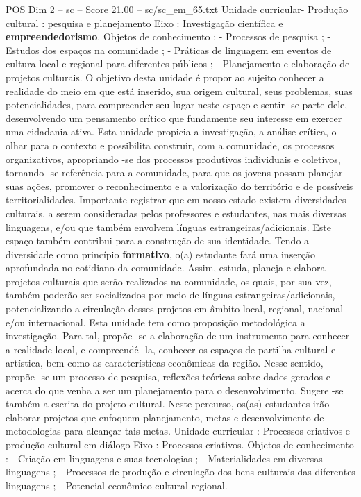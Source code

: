 \begin{textsample}{POS Dim 2 – sc – Score 21.00 – sc/sc\_em\_65.txt}
Unidade curricular- Produção cultural : pesquisa e planejamento Eixo : Investigação científica e \textbf{empreendedorismo}.
Objetos de conhecimento : - Processos de pesquisa ; - Estudos dos espaços na comunidade ; - Práticas de linguagem em eventos de cultura local e regional para diferentes públicos ; - Planejamento e elaboração de projetos culturais.
O objetivo desta unidade é propor ao sujeito conhecer a realidade do meio em que está inserido, sua origem cultural, seus problemas, suas potencialidades, para compreender seu lugar neste espaço e sentir -se parte dele, desenvolvendo um pensamento crítico que fundamente seu interesse em exercer uma cidadania ativa.
Esta unidade propicia a investigação, a análise crítica, o olhar para o contexto e possibilita construir, com a comunidade, os processos organizativos, apropriando -se dos processos produtivos individuais e coletivos, tornando -se referência para a comunidade, para que os jovens possam planejar suas ações, promover o reconhecimento e a valorização do território e de possíveis territorialidades.
Importante registrar que em nosso estado existem diversidades culturais, a serem consideradas pelos professores e estudantes, nas mais diversas linguagens, e/ou que também envolvem línguas estrangeiras/adicionais.
Este espaço também contribui para a construção de sua identidade.
Tendo a diversidade como princípio \textbf{formativo}, o(a) estudante fará uma inserção aprofundada no cotidiano da comunidade.
Assim, estuda, planeja e elabora projetos culturais que serão realizados na comunidade, os quais, por sua vez, também poderão ser socializados por meio de línguas estrangeiras/adicionais, potencializando a circulação desses projetos em âmbito local, regional, nacional e/ou internacional.
Esta unidade tem como proposição metodológica a investigação.
Para tal, propõe -se a elaboração de um instrumento para conhecer a realidade local, e compreendê -la, conhecer os espaços de partilha cultural e artística, bem como as características econômicas da região.
Nesse sentido, propõe -se um processo de pesquisa, reflexões teóricas sobre dados gerados e acerca do que venha a ser um planejamento para o desenvolvimento.
Sugere -se também a escrita do projeto cultural.
Neste percurso, os(as) estudantes irão elaborar projetos que enfoquem planejamento, metas e desenvolvimento de metodologias para alcançar tais metas.
Unidade curricular : Processos criativos e produção cultural em diálogo Eixo : Processos criativos.
Objetos de conhecimento : - Criação em linguagens e suas tecnologias ; - Materialidades em diversas linguagens ; - Processos de produção e circulação dos bens culturais das diferentes linguagens ; - Potencial econômico cultural regional.

\end{textsample}
